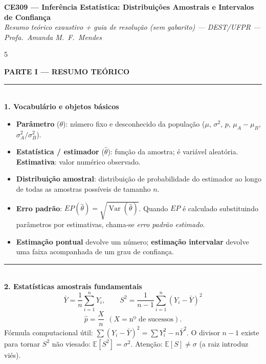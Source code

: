 \documentclass[a4paper,8pt]{extarticle}
\newcommand{\tit}[1]{\vspace{2pt}\textcolor{azul}{\rule{\linewidth}{0.6pt}}\\[1pt]\textbf{\textcolor{azul}{#1}}\\[1pt]}
\newcommand{\E}{\mathbb{E}}
\newcommand{\Var}{\operatorname{Var}}
\begin{document}
\raggedright
\footnotesize

\begin{center}
{\normalsize\bfseries\color{azul} CE309 — Inferência Estatística: Distribuições Amostrais e Intervalos de Confiança}\\[1pt]
{\scriptsize\itshape Resumo teórico exaustivo + guia de resolução (sem gabarito) — DEST/UFPR — Profa.\ Amanda M.\ F.\ Mendes}
\end{center}
\vspace{-4pt}

\begin{multicols*}{5}
\scriptsize

\begin{center}\colorbox{cinza}{\parbox{0.94\linewidth}{\centering\bfseries\color{azul} PARTE I — RESUMO TEÓRICO}}\end{center}

\tit{1. Vocabulário e objetos básicos}
\begin{itemize}
\item \textbf{Parâmetro} ($\theta$): número fixo e desconhecido da população ($\mu$, $\sigma^2$, $p$, $\mu_A-\mu_B$, $\sigma_A^2/\sigma_B^2$).
\item \textbf{Estatística / estimador} ($\hat\theta$): função da amostra; é variável aleatória. \textbf{Estimativa}: valor numérico observado.
\item \textbf{Distribuição amostral}: distribuição de probabilidade do estimador ao longo de todas as amostras possíveis de tamanho $n$.
\item \textbf{Erro padrão}: $EP(\hat\theta)=\sqrt{\Var(\hat\theta)}$. Quando $EP$ é calculado substituindo parâmetros por estimativas, chama-se \emph{erro padrão estimado}.
\item \textbf{Estimação pontual} devolve um número; \textbf{estimação intervalar} devolve uma faixa acompanhada de um grau de confiança.
\end{itemize}

\tit{2. Estatísticas amostrais fundamentais}
\[\bar Y=\frac1n\sum_{i=1}^n Y_i,\qquad S^2=\frac{1}{n-1}\sum_{i=1}^n (Y_i-\bar Y)^2\]
\[\hat p=\frac{X}{n}\ \ (X=\text{nº de sucessos}).\]
Fórmula computacional útil: $\sum (Y_i-\bar Y)^2=\sum Y_i^2-n\bar Y^2$.
O divisor $n-1$ existe para tornar $S^2$ não viesado: $\E[S^2]=\sigma^2$. Atenção: $\E[S]\ne\sigma$ (a raiz introduz viés).


\end{multicols*}
\end{document}
